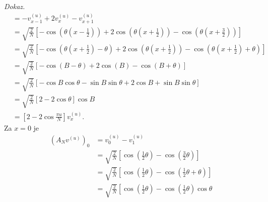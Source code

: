 \documentclass[a4paper,12pt,openright]{book}
\newenvironment{dokaz}{\emph{Dokaz.}\ }{\hspace{\fill}{$\Box$}}
\begin{document}
\begin{dokaz}
\begin{equation*}
\begin{aligned}
                        &= -v_{x-1}^{(u)} + 2v_x^{(u)} - v_{x+1}^{(u)}      \\ 
                        &= \sqrt{\frac{2}{N}} \left[-\cos\left(\theta(x - \frac{1}{2} )\right)
                                                   +2\cos\left(\theta(x + \frac{1}{2} )\right)
                                                    -\cos\left(\theta(x + \frac{3}{2} )\right) \right] \\
                        &= \sqrt{\frac{2}{N}} \left[-\cos\left(\theta(x + \frac{1}{2} ) - \theta \right)
                                                   +2\cos\left(\theta(x + \frac{1}{2} )\right)
                                                    -\cos\left(\theta(x + \frac{1}{2} ) + \theta \right) \right]    \\
                        &= \sqrt{\frac{2}{N}} \left[-\cos\left(B  - \theta \right)
                                                   +2\cos\left(B \right)
                                                    -\cos\left(B  + \theta \right) \right]     \\
                        &= \sqrt{\frac{2}{N}} \left[-\cos B \cos{\theta} - \sin B \sin{\theta} 
                                                    + 2\cos B 
                                                    + \sin B \sin{\theta} \right]  \\
                        &= \sqrt{\frac{2}{N}} \left[2 - 2\cos{\theta} \right] \cos B \\
                        &= \left[2 - 2\cos{\frac{\pi u}{N}} \right] v_x^{(u)}.
    \end{aligned}
\end{equation*}
Za $x=0$ je
\begin{equation*}
    \begin{aligned}
        (A_N v^{(u)})_0 &= v_{0}^{(u)} - v_{1}^{(u)}      \\ 
                        &= \sqrt{\frac{2}{N}} \left[ \cos\left(\frac{1}{2}\theta \right)
                                                    -\cos\left(\frac{3}{2}\theta \right) \right] \\
                        &= \sqrt{\frac{2}{N}} \left[ \cos\left(\frac{1}{2}\theta \right)
                                                    -\cos\left(\frac{1}{2}\theta + \theta \right) \right] \\
                        &= \sqrt{\frac{2}{N}} \left[ \cos\left(\frac{1}{2}\theta \right)
                                                    -\cos\left(\frac{1}{2}\theta \right)\cos\theta

\end{aligned}
\end{equation*}
\end{dokaz}
\end{document}
